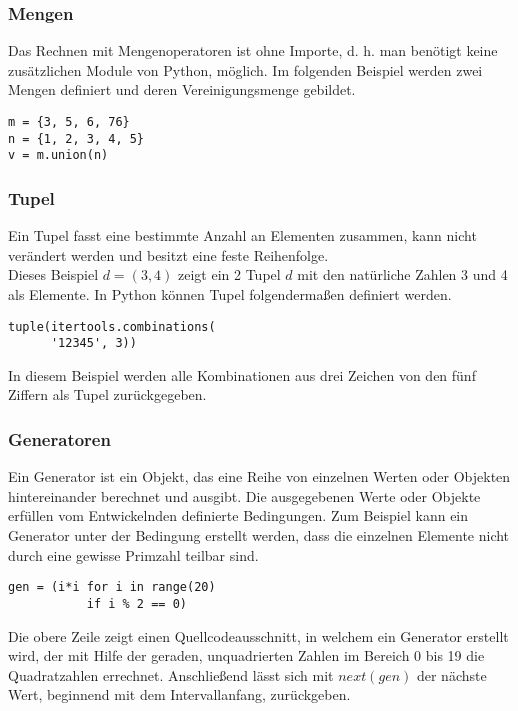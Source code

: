 \subsubsection{Mengen}
Das Rechnen mit Mengenoperatoren ist ohne Importe, d. h. man benötigt keine zusätzlichen Module von Python, möglich. Im folgenden Beispiel werden zwei Mengen definiert und deren Vereinigungsmenge gebildet.
\begin{lstlisting}
m = {3, 5, 6, 76}
n = {1, 2, 3, 4, 5}
v = m.union(n)
\end{lstlisting}

\subsubsection{Tupel}
Ein Tupel fasst eine bestimmte Anzahl an Elementen zusammen, kann nicht verändert werden und besitzt eine feste Reihenfolge.\\
Dieses Beispiel $d = (3, 4)$ zeigt ein 2 Tupel $d$ mit den natürliche Zahlen 3 und 4 als Elemente.
In Python können Tupel folgendermaßen definiert werden.
\begin{lstlisting}
tuple(itertools.combinations(
      '12345', 3))
\end{lstlisting}
In diesem Beispiel werden alle Kombinationen aus drei Zeichen von den fünf Ziffern als Tupel zurückgegeben.

\subsubsection{Generatoren}
Ein Generator ist ein Objekt, das eine Reihe von einzelnen Werten oder Objekten hintereinander berechnet und ausgibt. 
Die ausgegebenen Werte oder Objekte erfüllen vom Entwickelnden definierte Bedingungen. Zum Beispiel kann ein Generator unter der Bedingung erstellt werden, dass die einzelnen Elemente nicht durch eine gewisse Primzahl teilbar sind.
\begin{lstlisting}
gen = (i*i for i in range(20) 
           if i % 2 == 0)
\end{lstlisting}
Die obere Zeile zeigt einen Quellcodeausschnitt, in welchem ein Generator erstellt wird, der mit Hilfe der geraden, unquadrierten Zahlen im Bereich 0 bis 19 die Quadratzahlen errechnet. Anschließend lässt sich mit $next(gen)$
der nächste Wert, beginnend mit dem Intervallanfang, zurückgeben.


